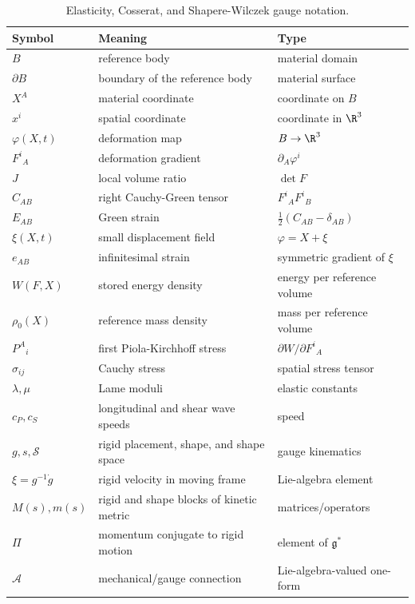 \begin{table}[htbp]
\centering
\caption{Elasticity, Cosserat, and Shapere-Wilczek gauge notation.}
\label{tab:elastic-gauge-notation}
\small
\begin{tabular}{p{}p{}p{}}
\toprule
Symbol & Meaning & Type\\
\midrule
\(B\) & reference body & material domain\\
\(\partial B\) & boundary of the reference body & material surface\\
\(X^A\) & material coordinate & coordinate on \(B\)\\
\(x^i\) & spatial coordinate & coordinate in \(\R^3\)\\
\(\varphi(X,t)\) & deformation map & \(B\to\R^3\)\\
\(F^i{}_A\) & deformation gradient & \(\partial_A\varphi^i\)\\
\(J\) & local volume ratio & \(\det F\)\\
\(C_{AB}\) & right Cauchy-Green tensor & \(F^i{}_AF^i{}_B\)\\
\(E_{AB}\) & Green strain & \(\frac12(C_{AB}-\delta_{AB})\)\\
\(\xi(X,t)\) & small displacement field & \(\varphi=X+\xi\)\\
\(e_{AB}\) & infinitesimal strain & symmetric gradient of \(\xi\)\\
\(W(F,X)\) & stored energy density & energy per reference volume\\
\(\rho_0(X)\) & reference mass density & mass per reference volume\\
\(P^A{}_i\) & first Piola-Kirchhoff stress & \(\partial W/\partial F^i{}_A\)\\
\(\sigma_{ij}\) & Cauchy stress & spatial stress tensor\\
\(\lambda,\mu\) & Lame moduli & elastic constants\\
\(c_P,c_S\) & longitudinal and shear wave speeds & speed\\
\(g,s,\mathcal S\) & rigid placement, shape, and shape space & gauge kinematics\\
\(\xi=g^{-1}\dot g\) & rigid velocity in moving frame & Lie-algebra element\\
\(M(s),m(s)\) & rigid and shape blocks of kinetic metric & matrices/operators\\
\(\Pi\) & momentum conjugate to rigid motion & element of \(\mathfrak g^*\)\\
\(\mathcal A\) & mechanical/gauge connection & Lie-algebra-valued one-form\\

\end{tabular}
\end{table}
